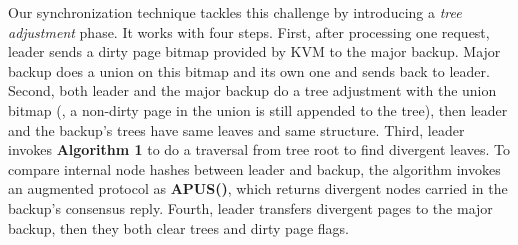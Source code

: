 Our synchronization technique tackles this challenge by introducing a 
\emph{tree adjustment} phase. It works with four steps. First, after 
processing one request, leader sends a dirty page bitmap provided by KVM to 
the major backup. Major backup does a union on this bitmap and its own one 
and sends back to leader. Second, both leader and the major backup do 
a tree adjustment with the union bitmap (\eg, a non-dirty page in the union is 
still appended to the tree), then leader and the backup's trees have same leaves 
and same structure. Third, leader invokes \textbf{Algorithm 1} to do a 
 traversal from tree root to find divergent leaves. To compare 
internal node hashes between leader and backup, the algorithm invokes an 
augmented \falcon protocol as \textbf{APUS()}, which returns divergent nodes 
carried in the backup's consensus reply. Fourth, leader transfers divergent 
pages to the major backup, then they both clear trees and dirty page flags.

